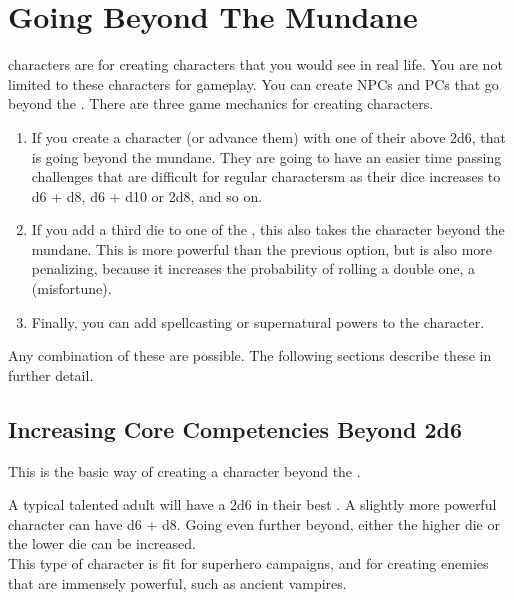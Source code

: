 \documentclass{LegrandOrangeTufteBook}
\begin{document}
\chapterspaceabove{6.75cm}
\chapterspacebelow{11.25cm}


\chapter*{Going Beyond The Mundane}

 characters are for creating characters that you would see in real life.
You are not limited to these characters for gameplay.
You can create NPCs and PCs that go beyond the .
There are three game mechanics for creating  characters.

\begin{enumerate}
    \item If you create a character (or advance them) with one of their  above 2d6, that is going beyond the mundane. They are going to have an easier time passing challenges that are difficult for regular charactersm as their dice increases to d6 + d8, d6 + d10 or 2d8, and so on.
    \item If you add a third die to one of the , this also takes the character beyond the mundane. This is more powerful than the previous option, but is also more penalizing, because it increases the probability of rolling a double one, a \term(misfortune).
    \item Finally, you can add spellcasting or supernatural powers to the character.
\end{enumerate}

Any combination of these are possible. The following sections describe these in further detail.

\section*{Increasing Core Competencies Beyond 2d6}

This is the basic way of creating a character beyond the .
\marginpar{
    \footnotesize
    
}

A typical talented adult will have a 2d6 in their best .
A slightly more powerful character can have d6 + d8.
Going even further beyond, either the higher die or the lower die can be increased.\\

This type of  character is fit for superhero campaigns,
and for creating enemies that are immensely powerful, such as ancient vampires.
\end{document}
